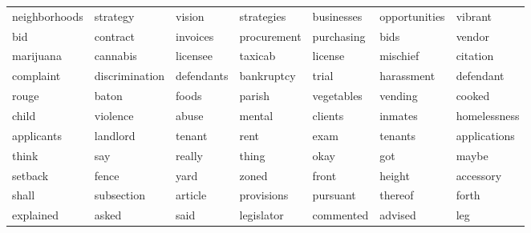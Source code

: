 \begin{table}[ht]
\begin{tabular}{lllllll}
  \cellcolor{blue!20}neighborhoods & \cellcolor{blue!20}strategy & \cellcolor{blue!20}vision & \cellcolor{blue!20}strategies & \cellcolor{blue!20}businesses & \cellcolor{blue!20}opportunities & \cellcolor{blue!20}vibrant \\ 
  \cellcolor{white}bid & \cellcolor{white}contract & \cellcolor{white}invoices & \cellcolor{white}procurement & \cellcolor{white}purchasing & \cellcolor{white}bids & \cellcolor{white}vendor \\ 
  \cellcolor{white}marijuana & \cellcolor{white}cannabis & \cellcolor{white}licensee & \cellcolor{white}taxicab & \cellcolor{white}license & \cellcolor{white}mischief & \cellcolor{white}citation \\ 
  \cellcolor{blue!10}complaint & \cellcolor{blue!10}discrimination & \cellcolor{blue!10}defendants & \cellcolor{blue!10}bankruptcy & \cellcolor{blue!10}trial & \cellcolor{blue!10}harassment & \cellcolor{blue!10}defendant \\ 
  \cellcolor{red!10}rouge & \cellcolor{red!10}baton & \cellcolor{red!10}foods & \cellcolor{red!10}parish & \cellcolor{red!10}vegetables & \cellcolor{red!10}vending & \cellcolor{red!10}cooked \\ 
  \cellcolor{red!10}child & \cellcolor{red!10}violence & \cellcolor{red!10}abuse & \cellcolor{red!10}mental & \cellcolor{red!10}clients & \cellcolor{red!10}inmates & \cellcolor{red!10}homelessness \\ 
  \cellcolor{red!10}applicants & \cellcolor{red!10}landlord & \cellcolor{red!10}tenant & \cellcolor{red!10}rent & \cellcolor{red!10}exam & \cellcolor{red!10}tenants & \cellcolor{red!10}applications \\ 
  \cellcolor{red!10}think & \cellcolor{red!10}say & \cellcolor{red!10}really & \cellcolor{red!10}thing & \cellcolor{red!10}okay & \cellcolor{red!10}got & \cellcolor{red!10}maybe \\ 
  \cellcolor{blue!20}setback & \cellcolor{blue!20}fence & \cellcolor{blue!20}yard & \cellcolor{blue!20}zoned & \cellcolor{blue!20}front & \cellcolor{blue!20}height & \cellcolor{blue!20}accessory \\ 
  \cellcolor{red!10}shall & \cellcolor{red!10}subsection & \cellcolor{red!10}article & \cellcolor{red!10}provisions & \cellcolor{red!10}pursuant & \cellcolor{red!10}thereof & \cellcolor{red!10}forth \\ 
  \cellcolor{red!20}explained & \cellcolor{red!20}asked & \cellcolor{red!20}said & \cellcolor{red!20}legislator & \cellcolor{red!20}commented & \cellcolor{red!20}advised & \cellcolor{red!20}leg \\ 

\end{tabular}
\end{table}
